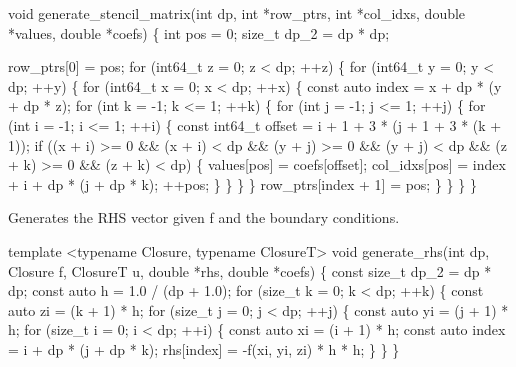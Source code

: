 \begin{DoxyCode}
\textcolor{keywordtype}{void} generate\_stencil\_matrix(\textcolor{keywordtype}{int} dp, \textcolor{keywordtype}{int} *row\_ptrs, \textcolor{keywordtype}{int} *col\_idxs,
                             \textcolor{keywordtype}{double} *values, \textcolor{keywordtype}{double} *coefs)
\{
    \textcolor{keywordtype}{int} pos = 0;
    \textcolor{keywordtype}{size\_t} dp\_2 = dp * dp;


    row\_ptrs[0] = pos;
    \textcolor{keywordflow}{for} (int64\_t z = 0; z < dp; ++z) \{
        \textcolor{keywordflow}{for} (int64\_t y = 0; y < dp; ++y) \{
            \textcolor{keywordflow}{for} (int64\_t x = 0; x < dp; ++x) \{
                \textcolor{keyword}{const} \textcolor{keyword}{auto} index = x + dp * (y + dp * z);
                \textcolor{keywordflow}{for} (\textcolor{keywordtype}{int} k = -1; k <= 1; ++k) \{
                    \textcolor{keywordflow}{for} (\textcolor{keywordtype}{int} j = -1; j <= 1; ++j) \{
                        \textcolor{keywordflow}{for} (\textcolor{keywordtype}{int} i = -1; i <= 1; ++i) \{
                            \textcolor{keyword}{const} int64\_t offset =
                                i + 1 + 3 * (j + 1 + 3 * (k + 1));
                            \textcolor{keywordflow}{if} ((x + i) >= 0 && (x + i) < dp && (y + j) >= 0 &&
                                (y + j) < dp && (z + k) >= 0 && (z + k) < dp) \{
                                values[pos] = coefs[offset];
                                col\_idxs[pos] = index + i + dp * (j + dp * k);
                                ++pos;
                            \}
                        \}
                    \}
                \}
                row\_ptrs[index + 1] = pos;
            \}
        \}
    \}
\}
\end{DoxyCode}


Generates the R\+HS vector given {\ttfamily f} and the boundary conditions.


\begin{DoxyCode}
\textcolor{keyword}{template} <\textcolor{keyword}{typename} Closure, \textcolor{keyword}{typename} ClosureT>
\textcolor{keywordtype}{void} generate\_rhs(\textcolor{keywordtype}{int} dp, Closure f, ClosureT u, \textcolor{keywordtype}{double} *rhs, \textcolor{keywordtype}{double} *coefs)
\{
    \textcolor{keyword}{const} \textcolor{keywordtype}{size\_t} dp\_2 = dp * dp;
    \textcolor{keyword}{const} \textcolor{keyword}{auto} h = 1.0 / (dp + 1.0);
    \textcolor{keywordflow}{for} (\textcolor{keywordtype}{size\_t} k = 0; k < dp; ++k) \{
        \textcolor{keyword}{const} \textcolor{keyword}{auto} zi = (k + 1) * h;
        \textcolor{keywordflow}{for} (\textcolor{keywordtype}{size\_t} j = 0; j < dp; ++j) \{
            \textcolor{keyword}{const} \textcolor{keyword}{auto} yi = (j + 1) * h;
            \textcolor{keywordflow}{for} (\textcolor{keywordtype}{size\_t} i = 0; i < dp; ++i) \{
                \textcolor{keyword}{const} \textcolor{keyword}{auto} xi = (i + 1) * h;
                \textcolor{keyword}{const} \textcolor{keyword}{auto} index = i + dp * (j + dp * k);
                rhs[index] = -f(xi, yi, zi) * h * h;
            \}
        \}
    \}
\end{DoxyCode}


